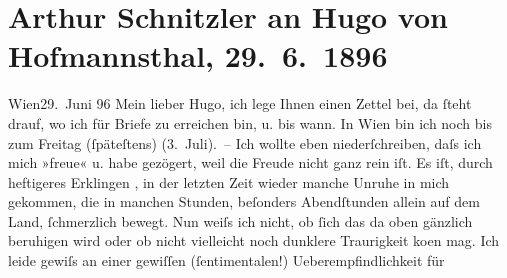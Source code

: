 

               \section[Arthur Schnitzler an Hugo von Hofmannsthal, 29. 6. 1896]{ Arthur Schnitzler an Hugo von Hofmannsthal, 29. 6. 1896}\nopagebreak{}\rehead{ }\begin{ledgroupsized}[t]{13cm}\normalsize\beginnumbering{} \toendnotes[C]{\smallbreak\pagebreak[2]} 
\toendnotes[C]{\smallbreak}\pstart
           \raggedleft{}{\pb}Wien29. Juni 96\pend
           \pstart
           Mein lieber Hugo, ich lege Ihnen einen Zettel bei, da ſteht
                    drauf, wo ich für Briefe zu erreichen bin, u. bis wann. In Wien bin ich noch bis zum Freitag
                    (ſpäteſtens) (3. Juli). –\pend
           \pstart
           Ich wollte eben niederſchreiben, daſs ich mich »freue« u. habe gezögert, weil die
                    Freude nicht ganz rein iſt. Es iſt, durch heftigeres Erklin{\pb}gen \label{K_L00557_1v}\label{K_L00557_1h}, in der letzten Zeit wieder manche Unruhe in mich
                    gekommen, die in manchen Stunden, beſonders Abendſtunden allein auf dem Land,
                    ſchmerzlich bewegt. Nun weiſs ich nicht, ob ſich das da oben gänzlich beruhigen
                    wird oder ob nicht vielleicht noch dunklere Traurigkeit ko{\geminationm}en mag. Ich leide gewiſs an {\pb}einer gewiſſen \introOben{}(\introOben{}ſentimentalen\introOben{}!)\introOben{} Ueberempfindlichkeit für

\end{ledgroupsized}
